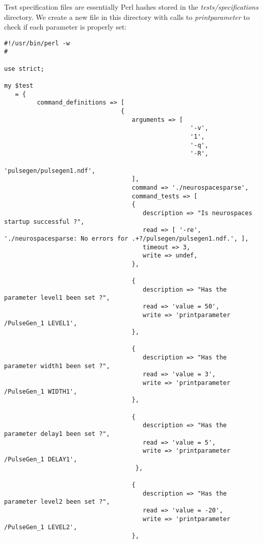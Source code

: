 \documentclass[12pt]{article}
\begin{document}
Test specification files are essentially Perl hashes stored in the {\it tests/specifications} directory. We create a new file in this directory with calls to {\it printparameter} to check if each parameter is properly set:
\begin{verbatim}
#!/usr/bin/perl -w
#

use strict;

my $test
   = {
         command_definitions => [
                                {
                                   arguments => [
                                                   '-v',
                                                   '1',
                                                   '-q',
                                                   '-R',
                                                   'pulsegen/pulsegen1.ndf',
                                   ],
                                   command => './neurospacesparse',
                                   command_tests => [
                                   {
                                      description => "Is neurospaces startup successful ?",
                                      read => [ '-re', './neurospacesparse: No errors for .+?/pulsegen/pulsegen1.ndf.', ],
                                      timeout => 3,
                                      write => undef,
                                   },

                                   {
                                      description => "Has the parameter level1 been set ?",
                                      read => 'value = 50',
                                      write => 'printparameter /PulseGen_1 LEVEL1',
                                   },

                                   {
                                      description => "Has the parameter width1 been set ?",
                                      read => 'value = 3',
                                      write => 'printparameter /PulseGen_1 WIDTH1',
                                   },

                                   {
                                      description => "Has the parameter delay1 been set ?",
                                      read => 'value = 5',
                                      write => 'printparameter /PulseGen_1 DELAY1',
                                    },

                                   {
                                      description => "Has the parameter level2 been set ?",
                                      read => 'value = -20',
                                      write => 'printparameter /PulseGen_1 LEVEL2',
                                   },


\end{verbatim}
\end{document}

